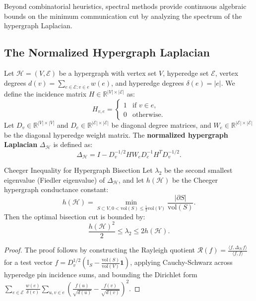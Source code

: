 Beyond combinatorial heuristics, spectral methods provide continuous algebraic bounds on the minimum communication cut by analyzing the spectrum of the hypergraph Laplacian.

\subsection{The Normalized Hypergraph Laplacian}
Let $\mathcal{H} = (V, \mathcal{E})$ be a hypergraph with vertex set $V$, hyperedge set $\mathcal{E}$, vertex degrees $d(v) = \sum_{e \in \mathcal{E}: v \in e} w(e)$, and hyperedge degrees $\delta(e) = |e|$. We define the incidence matrix $H \in \mathbb{R}^{|V| \times |\mathcal{E}|}$ as:
\begin{equation}
    H_{v, e} = \begin{cases} 1 & \text{if } v \in e, \\ 0 & \text{otherwise.} \end{cases}
\end{equation}
Let $D_v \in \mathbb{R}^{|V| \times |V|}$ and $D_e \in \mathbb{R}^{|\mathcal{E}| \times |\mathcal{E}|}$ be diagonal degree matrices, and $W_e \in \mathbb{R}^{|\mathcal{E}| \times |\mathcal{E}|}$ be the diagonal hyperedge weight matrix. The \textbf{normalized hypergraph Laplacian} $\Delta_{\mathcal{H}}$ is defined as:
\begin{equation}
    \Delta_{\mathcal{H}} = I - D_v^{-1/2} H W_e D_e^{-1} H^T D_v^{-1/2}.
    \label{eq:hypergraph_laplacian}
\end{equation}

\begin{theorembox}{Cheeger Inequality for Hypergraph Bisection}
Let $\lambda_2$ be the second smallest eigenvalue (Fiedler eigenvalue) of $\Delta_{\mathcal{H}}$, and let $h(\mathcal{H})$ be the Cheeger hypergraph conductance constant:
\begin{equation}
    h(\mathcal{H}) = \min_{S \subset V, 0 < \text{vol}(S) \le \frac{1}{2}\text{vol}(V)} \frac{|\partial S|}{\text{vol}(S)}.
\end{equation}
Then the optimal bisection cut is bounded by:
\begin{equation}
    \frac{h(\mathcal{H})^2}{2} \le \lambda_2 \le 2 h(\mathcal{H}).
    \label{eq:cheeger_hypergraph}
\end{equation}
\end{theorembox}

\begin{proof}
The proof follows by constructing the Rayleigh quotient $\mathcal{R}(f) = \frac{\langle f, \Delta_{\mathcal{H}} f \rangle}{\langle f, f \rangle}$ for a test vector $f = D_v^{1/2} (\mathbb{I}_S - \frac{\text{vol}(S)}{\text{vol}(V)}\bm{1})$, applying Cauchy-Schwarz across hyperedge pin incidence sums, and bounding the Dirichlet form $\sum_{e \in \mathcal{E}} \frac{w(e)}{\delta(e)} \sum_{u, v \in e} \left( \frac{f(u)}{\sqrt{d(u)}} - \frac{f(v)}{\sqrt{d(v)}} \right)^2$.
\end{proof}

